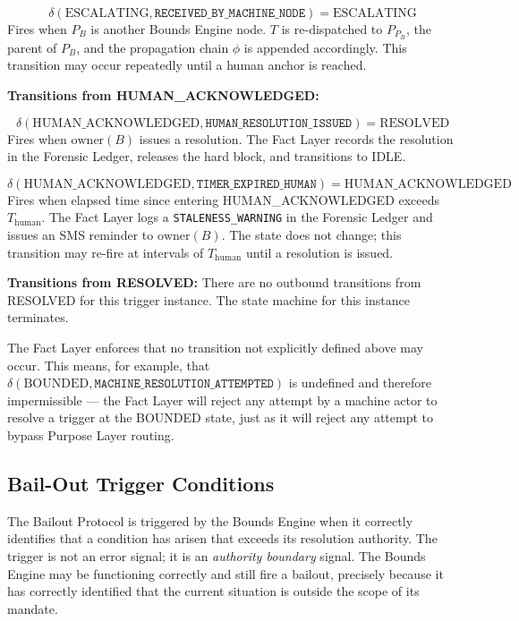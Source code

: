 \documentclass[12pt]{article}
\begin{document}
\begin{equation}
\delta(\text{ESCALATING}, \texttt{RECEIVED\_BY\_MACHINE\_NODE}) = \text{ESCALATING}
\end{equation}
Fires when $P_B$ is another Bounds Engine node. $T$ is re-dispatched to $P_{P_B}$, the parent of $P_B$, and the propagation chain $\phi$ is appended accordingly. This transition may occur repeatedly until a human anchor is reached.

\bigskip

\textbf{Transitions from HUMAN\_ACKNOWLEDGED:}

\begin{equation}
\delta(\text{HUMAN\_ACKNOWLEDGED}, \texttt{HUMAN\_RESOLUTION\_ISSUED}) = \text{RESOLVED}
\end{equation}
Fires when $\text{owner}(B)$ issues a resolution. The Fact Layer records the resolution in the Forensic Ledger, releases the hard block, and transitions to IDLE.

\begin{equation}
\delta(\text{HUMAN\_ACKNOWLEDGED}, \texttt{TIMER\_EXPIRED\_HUMAN}) = \text{HUMAN\_ACKNOWLEDGED}
\end{equation}
Fires when elapsed time since entering HUMAN\_ACKNOWLEDGED exceeds $T_{\text{human}}$. The Fact Layer logs a \texttt{STALENESS\_WARNING} in the Forensic Ledger and issues an SMS reminder to $\text{owner}(B)$. The state does not change; this transition may re-fire at intervals of $T_{\text{human}}$ until a resolution is issued.

\bigskip

\textbf{Transitions from RESOLVED:} There are no outbound transitions from RESOLVED for this trigger instance. The state machine for this instance terminates.

\bigskip

The Fact Layer enforces that no transition not explicitly defined above may occur. This means, for example, that $\delta(\text{BOUNDED}, \texttt{MACHINE\_RESOLUTION\_ATTEMPTED})$ is undefined and therefore impermissible --- the Fact Layer will reject any attempt by a machine actor to resolve a trigger at the BOUNDED state, just as it will reject any attempt to bypass Purpose Layer routing.

\subsection{Bail-Out Trigger Conditions}
\label{sec:trigger-conditions}

The Bailout Protocol is triggered by the Bounds Engine when it correctly identifies that a condition has arisen that exceeds its resolution authority. The trigger is not an error signal; it is an \textit{authority boundary} signal. The Bounds Engine may be functioning correctly and still fire a bailout, precisely because it has correctly identified that the current situation is outside the scope of its mandate.
\end{document}

